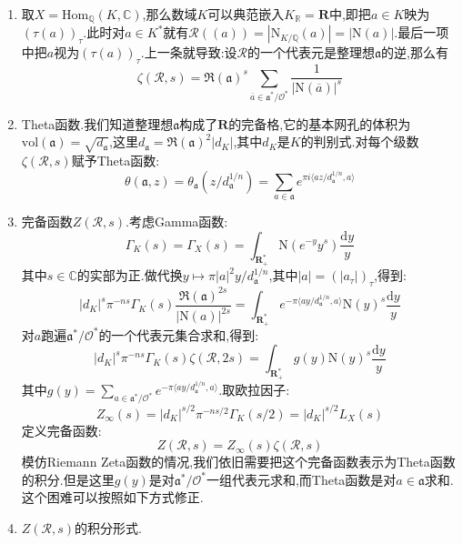 \begin{enumerate}
\begin{proof}
		设$a\in\mathfrak{a}^*$,那么$a\mathfrak{a}^{-1}$是$\mathscr{R}$中的整理想,并且如果$a\mathfrak{a}^{-1}=b\mathfrak{a}^{-1}$,那么有$(a)=(b)$,进而$ab^{-1}\in\mathscr{O}^*$,这证明了单射.反过来任取整理想$\mathfrak{b}\in\mathscr{R}$,按照定义就有$\mathfrak{b}=a\mathfrak{a}^{-1}$,进而有$a\in\mathfrak{a}\mathfrak{b}\subseteq\mathfrak{a}$.
	\end{proof}
	\item 取$X=\mathrm{Hom}_{\mathbb{Q}}(K,\mathbb{C})$,那么数域$K$可以典范嵌入$K_{\mathbb{R}}=\textbf{R}$中,即把$a\in K$映为$(\tau(a))_{\tau}$.此时对$a\in K^*$就有$\mathscr{R}((a))=|\mathrm{N}_{K/\mathbb{Q}}(a)|=|\mathrm{N}(a)|$.最后一项中把$a$视为$(\tau(a))_{\tau}$.上一条就导致:设$\mathscr{R}$的一个代表元是整理想$\mathfrak{a}$的逆,那么有
	$$\zeta(\mathscr{R},s)=\mathfrak{R}(\mathfrak{a})^s\sum_{\overline{a}\in\mathfrak{a}^*/\mathscr{O}^*}\frac{1}{|\mathrm{N}(\overline{a})|^s}$$
	\item Theta函数.我们知道整理想$\mathfrak{a}$构成了$\textbf{R}$的完备格,它的基本网孔的体积为$\mathrm{vol}(\mathfrak{a})=\sqrt{d_{\mathfrak{a}}}$,这里$d_{\mathfrak{a}}=\mathfrak{R}(\mathfrak{a})^2|d_K|$,其中$d_K$是$K$的判别式.对每个级数$\zeta(\mathscr{R},s)$赋予Theta函数:
	$$\theta(\mathfrak{a},z)=\theta_{\mathfrak{a}}(z/d_{\mathfrak{a}}^{1/n})=\sum_{a\in\mathfrak{a}}e^{\pi i\langle az/d_{\mathfrak{a}}^{1/n},a\rangle}$$
	\item 完备函数$Z(\mathscr{R},s)$.考虑Gamma函数:
	$$\Gamma_K(s)=\Gamma_X(s)=\int_{\textbf{R}_+^*}\mathrm{N}(e^{-y}y^s)\frac{\mathrm{d}y}{y}$$
	其中$s\in\mathbb{C}$的实部为正.做代换$y\mapsto\pi|a|^2y/d_{\mathfrak{a}}^{1/n}$,其中$|a|=(|a_{\tau}|)_{\tau}$,得到:
	$$|d_K|^s\pi^{-ns}\Gamma_K(s)\frac{\mathfrak{R}(\mathfrak{a})^{2s}}{|\mathrm{N}(a)|^{2s}}=\int_{\textbf{R}_+^*}e^{-\pi\langle ay/d_{\mathfrak{a}}^{1/n},a\rangle}\mathrm{N}(y)^s\frac{\mathrm{d}y}{y}$$
	对$a$跑遍$\mathfrak{a}^*/\mathscr{O}^*$的一个代表元集合求和,得到:
	$$|d_K|^s\pi^{-ns}\Gamma_K(s)\zeta(\mathscr{R},2s)=\int_{\textbf{R}_+^*}g(y)\mathrm{N}(y)^s\frac{\mathrm{d}y}{y}$$
	其中$g(y)=\sum_{a\in\mathfrak{a}^*/\mathscr{O}^*}e^{-\pi\langle ay/d_{\mathfrak{a}}^{1/n},a\rangle}$.取欧拉因子:
	$$Z_{\infty}(s)=|d_K|^{s/2}\pi^{-ns/2}\Gamma_K(s/2)=|d_K|^{s/2}L_X(s)$$
	定义完备函数:
	$$Z(\mathscr{R},s)=Z_{\infty}(s)\zeta(\mathscr{R},s)$$
	模仿Riemann Zeta函数的情况,我们依旧需要把这个完备函数表示为Theta函数的积分.但是这里$g(y)$是对$\mathfrak{a}^*/\mathscr{O}^*$一组代表元求和,而Theta函数是对$a\in\mathfrak{a}$求和.这个困难可以按照如下方式修正.
	\item $Z(\mathscr{R},s)$的积分形式.
	\begin{enumerate}[(1)]

\end{enumerate}
\end{enumerate}
